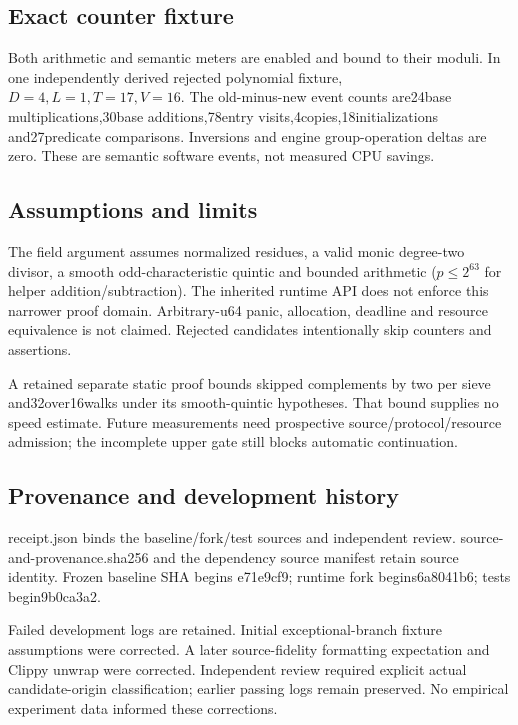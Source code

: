 \documentclass[11pt]{article}
\begin{document}
\subsection*{Exact counter fixture}
Both arithmetic and semantic meters are enabled and bound to their moduli. In one independently derived rejected polynomial fixture, $D=4,L=1,T=17,V=16$. The old-minus-new event counts are24base multiplications,30base additions,78entry visits,4copies,18initializations and27predicate comparisons. Inversions and engine group-operation deltas are zero. These are semantic software events, not measured CPU savings.
\subsection*{Assumptions and limits}
The field argument assumes normalized residues, a valid monic degree-two divisor, a smooth odd-characteristic quintic and bounded arithmetic ($p\leq2^{63}$ for helper addition/subtraction). The inherited runtime API does not enforce this narrower proof domain. Arbitrary-u64 panic, allocation, deadline and resource equivalence is not claimed. Rejected candidates intentionally skip counters and assertions.\par
A retained separate static proof bounds skipped complements by two per sieve and32over16walks under its smooth-quintic hypotheses. That bound supplies no speed estimate. Future measurements need prospective source/protocol/resource admission; the incomplete upper gate still blocks automatic continuation.
\subsection*{Provenance and development history}
receipt.json binds the baseline/fork/test sources and independent review. source-and-provenance.sha256 and the dependency source manifest retain source identity. Frozen baseline SHA begins e71e9cf9; runtime fork begins6a8041b6; tests begin9b0ca3a2.\par
Failed development logs are retained. Initial exceptional-branch fixture assumptions were corrected. A later source-fidelity formatting expectation and Clippy unwrap were corrected. Independent review required explicit actual candidate-origin classification; earlier passing logs remain preserved. No empirical experiment data informed these corrections.
\end{document}
